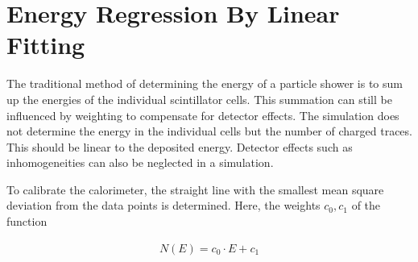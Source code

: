 \documentclass[12pt, a4paper]{thesis}
\begin{document}
\begin{figure}[hbtp]%
  \centering
  \qquad
  \caption{}%
  \label{fig:y-distri}%
\end{figure}


\section{Energy Regression By Linear Fitting}
\label{sec:orgd10286d}

The traditional method of determining the energy of a particle shower
is to sum up the energies of the individual scintillator cells. This
summation can still be influenced by weighting to compensate for
detector effects. The simulation does not determine the energy in the
individual cells but the number of charged traces. This should be
linear to the deposited energy. Detector effects such as
inhomogeneities can also be neglected in a simulation.

To calibrate the calorimeter, the straight line with the smallest mean
square deviation from the data points is determined. Here, the weights
\(c_0, c_1\) of the function

\begin{align}
  N(E) = c_0 \cdot E + c_1
\end{align}
\end{document}
